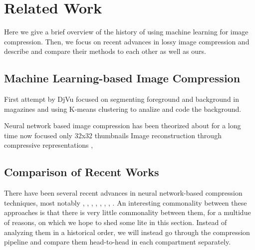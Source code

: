 \documentclass{article}
\begin{document}
%
%

\section{Related Work}
\par
Here we give a brief overview of the history of using machine learning for image
compression. Then, we focus on recent advances in lossy image compression and
describe and compare their methods to each other as well as ours.
\subsection{Machine Learning-based Image Compression}
\par

First attempt by \cite{bottou1998high} DjVu focused on segmenting foreground and
background in magazines and using K-means clustering to analize and code the
background.

Neural network based image compression has been theorized about for a long time
now \cite{mougeot1991image} \cite{jiang1999image} 
\cite{toderici2015variable} focused only 32x32 thumbnails
Image reconstruction through compressive representations \cite{denton2015deep},
\cite{gregor2015draw}

\subsection{Comparison of Recent Works}
\label{sec:lit_comparison}
\par

There have been several recent advances in neural network-based compression
techniques, most notably \cite{toderici2015variable}, \cite{balle2016end},
\cite{toderici2017full}, \cite{theis2017lossy}, \cite{rippel2017real},
\cite{balle2018variational}, \cite{johnston2018cvpr}, \cite{mentzer2018cvpr}. 
An interesting commonality between these approaches is that there is very little
commonality between them, for a multidue of reasons, on which we hope to shed
some lite in this section. Instead of analyzing them in a historical order, we
will instead go through the compression pipeline and compare them head-to-head
in each compartment separately. 
\end{document}
